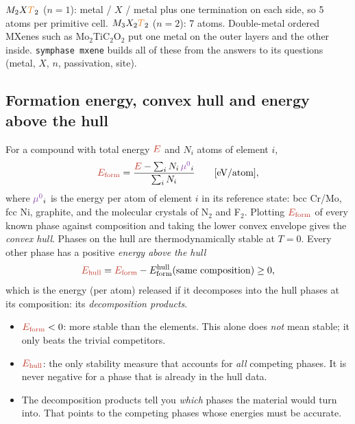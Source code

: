 \documentclass[11pt,a4paper]{article}
\newcommand{\Ef}{\textcolor{ecol}{E_{\mathrm{form}}}}
\newcommand{\Eh}{\textcolor{ecol}{E_{\mathrm{hull}}}}
\newcommand{\Etot}{\textcolor{ecol}{E}}
\newcommand{\muzero}{\textcolor{mucol}{\mu^{0}}}
\newcommand{\Tm}{\textcolor{tcol}{T}}
\begin{document}
\begin{learn}
$M_2X\Tm_2$ ($n=1$): metal / $X$ / metal plus one termination on each side, so 5 atoms per primitive cell.\;
$M_3X_2\Tm_2$ ($n=2$): 7 atoms.\; Double-metal ordered MXenes such as Mo$_2$TiC$_2$O$_2$ put one metal on the outer layers and the other inside.
\texttt{symphase mxene} builds all of these from the answers to its questions (metal, $X$, $n$, passivation, site).
\end{learn}

\subsection{Formation energy, convex hull and energy above the hull}
For a compound with total energy $\Etot$ and $N_i$ atoms of element $i$,
\begin{equation}
\Ef = \frac{\Etot - \sum_i N_i\,\muzero_i}{\sum_i N_i}\qquad[\text{eV/atom}],
\end{equation}
where $\muzero_i$ is the energy per atom of element $i$ in its reference state: bcc Cr/Mo, fcc Ni, graphite, and the molecular crystals
of N$_2$ and F$_2$. Plotting $\Ef$ of every known phase against composition and taking the lower convex envelope gives the \emph{convex hull}.
Phases on the hull are thermodynamically stable at $T=0$. Every other phase has a positive \emph{energy above the hull}
\begin{equation}
\Eh = \Ef - E_{\mathrm{form}}^{\mathrm{hull}}(\text{same composition}) \ge 0 ,
\end{equation}
which is the energy (per atom) released if it decomposes into the hull phases at its composition: its \emph{decomposition products}.

\begin{learn}
\begin{itemize}
\item $\Ef < 0$: more stable than the elements. This alone does \emph{not} mean stable; it only beats the trivial competitors.
\item $\Eh$: the only stability measure that accounts for \emph{all} competing phases. It is never negative for a
phase that is already in the hull data.
\item The decomposition products tell you \emph{which} phases the material would turn into. That points to the competing
phases whose energies must be accurate.
\end{itemize}
\end{learn}
\end{document}
